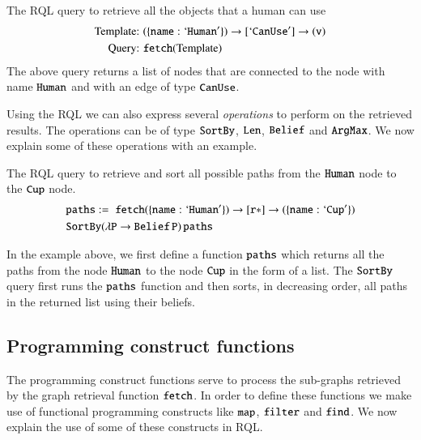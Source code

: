 \begin{example}
The RQL query to retrieve all the objects that a human can use
\begin{align*}
\text{Template: }&{\tt(\{name:`Human'\})\rightarrow [`CanUse'] \rightarrow (v)}\\
\text{Query: }&{\tt fetch}(\text{Template})
\end{align*}
The above query returns a list of nodes that are connected to the node with name ${\tt{Human}}$ and with an edge of type ${\tt{CanUse}}$.%
\end{example}
Using the RQL  we can also express several \textit{operations} to perform on the retrieved results.
The operations can be of type   ${\tt SortBy}$, ${\tt Len}$, ${\tt Belief}$ and ${\tt ArgMax}$. We now
explain some of these operations with an example.
\begin{example}
The RQL query to retrieve and sort all possible paths from the ${\tt{Human}}$ node to the ${\tt{Cup}}$ node.
{\small
\begin{align*}
 &{\tt paths }:= \;{\tt fetch (\{name:`Human'\})\rightarrow [r *] \rightarrow (\{name:`Cup'\})}\\
& {\tt SortBy(\lambda P \rightarrow Belief \, P) \, paths} \\
\end{align*}
}

In the example above, we first define a function ${\tt paths}$ which returns all  the paths from the node ${\tt Human }$ to the node ${\tt Cup }$ in the form of a list. The ${\tt SortBy}$ query first runs the ${\tt paths}$ function and then sorts, in decreasing order, all paths in the returned list using their beliefs.
\end{example}


\subsection{Programming construct functions}
The programming construct functions serve to process the sub-graphs retrieved by the graph retrieval function ${\tt fetch}$. In order to define these functions we make use of functional programming constructs like ${\tt map}$, ${\tt filter}$ and ${\tt find}$. We now explain the use of some of these constructs in RQL.

